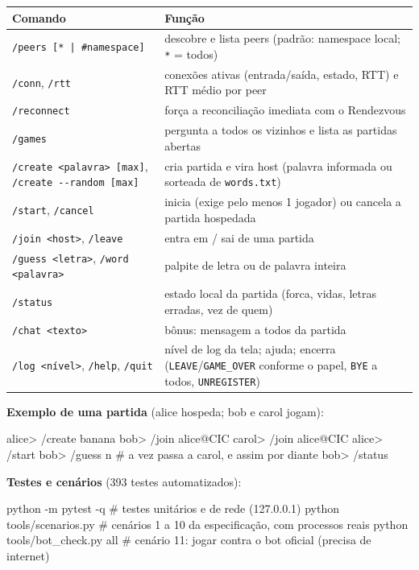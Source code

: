 \documentclass[11pt,a4paper]{article}
\begin{document}
\begin{tabularx}{\textwidth}{@{}P{5.6cm}Y@{}}
\toprule
\textbf{Comando} & \textbf{Função}\\
\midrule
\texttt{/peers [* | \#namespace]} & descobre e lista peers (padrão: namespace local; \texttt{*} = todos)\\
\texttt{/conn}, \texttt{/rtt} & conexões ativas (entrada/saída, estado, RTT) e RTT médio por peer\\
\texttt{/reconnect} & força a reconciliação imediata com o Rendezvous\\
\texttt{/games} & pergunta a todos os vizinhos e lista as partidas abertas\\
\texttt{/create <palavra> [max]}, \texttt{/create -{}-random [max]} & cria partida e vira host (palavra informada ou sorteada de \texttt{words.txt})\\
\texttt{/start}, \texttt{/cancel} & inicia (exige pelo menos 1 jogador) ou cancela a partida hospedada\\
\texttt{/join <host>}, \texttt{/leave} & entra em / sai de uma partida\\
\texttt{/guess <letra>}, \texttt{/word <palavra>} & palpite de letra ou de palavra inteira\\
\texttt{/status} & estado local da partida (forca, vidas, letras erradas, vez de quem)\\
\texttt{/chat <texto>} & bônus: mensagem a todos da partida\\
\texttt{/log <nível>}, \texttt{/help}, \texttt{/quit} & nível de log da tela; ajuda; encerra (\texttt{LEAVE}/\texttt{GAME\_OVER} conforme o papel, \texttt{BYE} a todos, \texttt{UNREGISTER})\\
\bottomrule
\end{tabularx}

\textbf{Exemplo de uma partida} (alice hospeda; bob e carol jogam):
\begin{codigo}
alice> /create banana
bob>   /join alice@CIC        carol> /join alice@CIC
alice> /start
bob>   /guess n               # a vez passa a carol, e assim por diante
bob>   /status
\end{codigo}
\textbf{Testes e cenários} (393 testes automatizados):
\begin{codigo}
python -m pytest -q                 # testes unitários e de rede (127.0.0.1)
python tools/scenarios.py           # cenários 1 a 10 da especificação, com processos reais
python tools/bot_check.py all       # cenário 11: jogar contra o bot oficial (precisa de internet)
\end{codigo}
\end{document}

